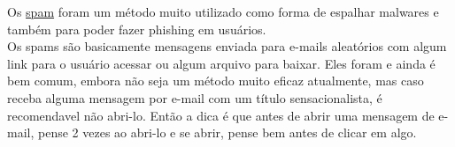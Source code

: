 \documentclass[12pt, letterpaper]{report}
\begin{document}
\pagebreak

	Os \href{https://criptowiki.miraheze.org/wiki/Spam}{spam} foram um método muito utilizado como forma de espalhar malwares e também para poder fazer phishing em usuários.\\

	Os spams são basicamente mensagens enviada para e-mails aleatórios com algum link para o usuário acessar ou algum arquivo para baixar. Eles foram e ainda é bem comum, embora não seja um método muito eficaz atualmente, mas caso receba alguma mensagem por e-mail com um título sensacionalista, é recomendavel não abri-lo. Então a dica é que antes de abrir uma mensagem de e-mail, pense 2 vezes ao abri-lo e se abrir, pense bem antes de clicar em algo.\\
\end{document}
